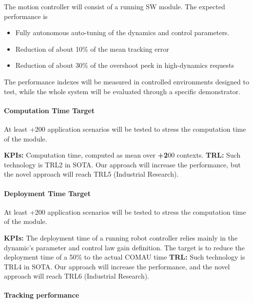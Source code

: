 The motion controller will consist of a running SW module. The expected
performance is

\begin{itemize}[arrow]
\item
  Fully autonomous auto-tuning of the dynamics and control parameters.
\item
  Reduction of about 10\% of the mean tracking error
\item
  Reduction of about 30\% of the overshoot peek in high-dynamics
  requests
\end{itemize}

The performance indexes will be measured in controlled environments
designed to test, while the whole system will be evaluated through a
specific demonstrator.

\paragraph{Computation Time Target}\label{computation-time-target-1}

At least +200 application scenarios will be tested to stress the
computation time of the module.

\textbf{KPIs:} Computation time, computed as mean over \textbf{+2}00
contexts. \textbf{\textbar{} TRL:} Such technology is TRL2 in SOTA. Our
approach will increase the performance, but the novel approach will
reach TRL5 (Industrial Research).

\paragraph{Deployment Time Target}\label{deployment-time-target}

At least +200 application scenarios will be tested to stress the
computation time of the module.

\textbf{KPIs:} The deployment time of a running robot controller relies
mainly in the dynamic's parameter and control law gain definition. The
target is to reduce the deployment time of a 50\% to the actual COMAU
time \textbf{\textbar{} TRL:} Such technology is TRL4 in SOTA. Our
approach will increase the performance, and the novel approach will
reach TRL6 (Industrial Research).

\paragraph{Tracking performance}\label{tracking-performance}

